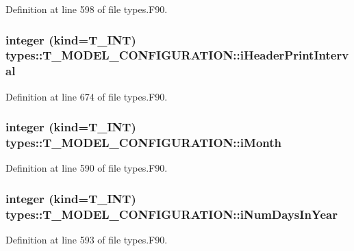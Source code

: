 Definition at line 598 of file types.F90.

\hypertarget{typetypes_1_1_t___m_o_d_e_l___c_o_n_f_i_g_u_r_a_t_i_o_n_adf2574a4ac13000a14c8e3d945afee8a}{
\subsubsection[{iHeaderPrintInterval}]{\setlength{\rightskip}{0pt plus 5cm}integer (kind={\bf T\_\-INT}) {\bf types::T\_\-MODEL\_\-CONFIGURATION::iHeaderPrintInterval}}}
\label{typetypes_1_1_t___m_o_d_e_l___c_o_n_f_i_g_u_r_a_t_i_o_n_adf2574a4ac13000a14c8e3d945afee8a}


Definition at line 674 of file types.F90.

\hypertarget{typetypes_1_1_t___m_o_d_e_l___c_o_n_f_i_g_u_r_a_t_i_o_n_a7bf078a917b57832ed52f1535ab13b67}{
\subsubsection[{iMonth}]{\setlength{\rightskip}{0pt plus 5cm}integer (kind={\bf T\_\-INT}) {\bf types::T\_\-MODEL\_\-CONFIGURATION::iMonth}}}
\label{typetypes_1_1_t___m_o_d_e_l___c_o_n_f_i_g_u_r_a_t_i_o_n_a7bf078a917b57832ed52f1535ab13b67}


Definition at line 590 of file types.F90.

\hypertarget{typetypes_1_1_t___m_o_d_e_l___c_o_n_f_i_g_u_r_a_t_i_o_n_ab415d727eca597e6f062a4be8321945d}{
\subsubsection[{iNumDaysInYear}]{\setlength{\rightskip}{0pt plus 5cm}integer (kind={\bf T\_\-INT}) {\bf types::T\_\-MODEL\_\-CONFIGURATION::iNumDaysInYear}}}
\label{typetypes_1_1_t___m_o_d_e_l___c_o_n_f_i_g_u_r_a_t_i_o_n_ab415d727eca597e6f062a4be8321945d}


Definition at line 593 of file types.F90.

